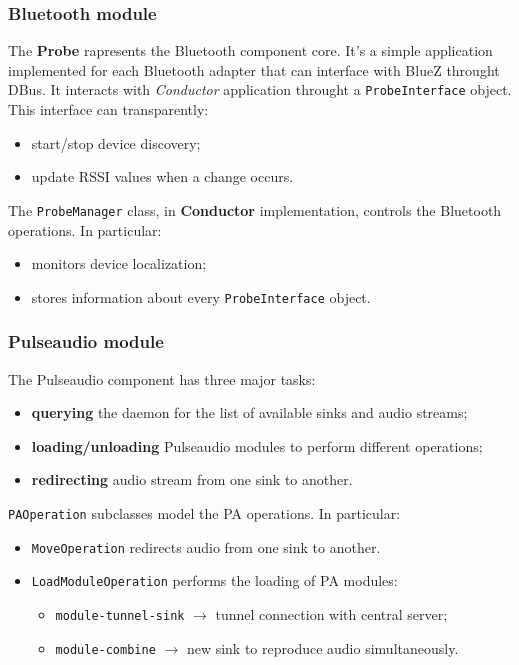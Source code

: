 \documentclass{beamer}
\begin{document}
\begin{frame}
\frametitle{Bluetooth module}
The \textbf{Probe} rapresents the Bluetooth component core. It's a simple application implemented for each Bluetooth adapter that can interface with BlueZ throught DBus. It interacts with \textsl{Conductor} application throught a \texttt{ProbeInterface} object.\\ This interface can transparently:
\begin{itemize}
	\item start/stop device discovery;
	\item update RSSI values when a change occurs.
\end{itemize}
The \texttt{ProbeManager} class, in \textbf{Conductor} implementation, controls the Bluetooth operations. In particular:
\begin{itemize}
	\item monitors device localization;
	\item stores information about every \texttt{ProbeInterface} object.
\end{itemize}
\end{frame}

\begin{frame}
\frametitle{Pulseaudio module}
The Pulseaudio component has three major tasks:
\begin{itemize}
	\item \textbf{querying} the daemon for the list of available sinks and audio streams;
	\item \textbf{loading/unloading} Pulseaudio modules to perform different operations;
	\item \textbf{redirecting} audio stream from one sink to another.
\end{itemize}
\texttt{PAOperation} subclasses model the PA operations. In particular: \\
\begin{itemize}
	\item \texttt{MoveOperation} redirects audio from one sink to another.
	\item \texttt{LoadModuleOperation} performs the loading of PA modules:
		\begin{itemize}
			\item \texttt{module-tunnel-sink} $\rightarrow$ tunnel connection with central server;
			\item \texttt{module-combine} $\rightarrow$ new sink to reproduce audio simultaneously.
		\end{itemize}
	\end{itemize}
\end{frame}
\end{document}
